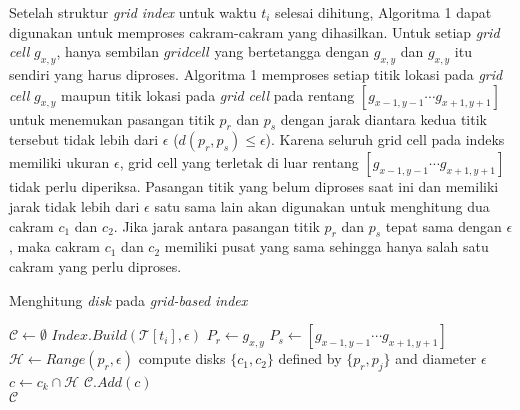 \par Setelah struktur \textit{grid index} untuk waktu $t_i$ selesai dihitung, Algoritma 1 dapat digunakan untuk memproses cakram-cakram yang dihasilkan. Untuk setiap \textit{grid cell} $g_{x,y}$, hanya sembilan $grid cell$ yang bertetangga dengan $g_{x,y}$ dan $g_{x,y}$ itu sendiri yang harus diproses. Algoritma 1 memproses setiap titik lokasi pada \textit{grid cell} $g_{x,y}$ maupun titik lokasi pada \textit{grid cell} pada rentang $[g_{x-1,y-1}\cdots g_{x+1,y+1}]$ untuk menemukan pasangan titik $p_r$ dan $p_s$ dengan jarak diantara kedua titik tersebut tidak lebih dari $\epsilon$ ($d(p_r,p_s)\leq\epsilon$). Karena seluruh grid cell pada indeks memiliki ukuran $\epsilon$, grid cell yang terletak di luar rentang $[g_{x-1,y-1}\cdots g_{x+1,y+1}]$ tidak perlu diperiksa. Pasangan titik yang belum diproses saat ini dan memiliki jarak tidak lebih dari $\epsilon$ satu sama lain akan digunakan untuk menghitung dua cakram $c_1$ dan $c_2$. Jika jarak antara pasangan titik $p_r$ dan $p_s$  tepat sama dengan $\epsilon$, maka cakram $c_1$ dan $c_2$ memiliki pusat yang sama sehingga hanya salah satu cakram yang perlu diproses.

\begin{algorithm}
\caption{ Menghitung \textit{disk} pada \textit{grid-based index}}
\begin{algorithmic}[1]
\State $\mathcal{C}\gets\emptyset$
\State $Index.Build(\mathcal{T}[t_i],\epsilon)$
	\State $P_r\gets g_{x,y}$
	\State $P_s\gets [g_{x-1,y-1}\cdots g_{x+1,y+1}]$
		\State $\mathcal{H}\gets Range(p_r,\epsilon)$
					\State compute disks $\{c_1,c_2\}$ defined by $\{p_r,p_j\}$ and diameter $\epsilon$
					\State $c\gets c_k\cap\mathcal{H}$
						\State $\mathcal{C}.Add(c)$
					\EndIf
					\EndFor
				\EndIf
			\EndFor
		\EndFor
	\EndIf
\EndFor\\
\Return $\mathcal{C}$
\end{algorithmic}
\end{algorithm}

